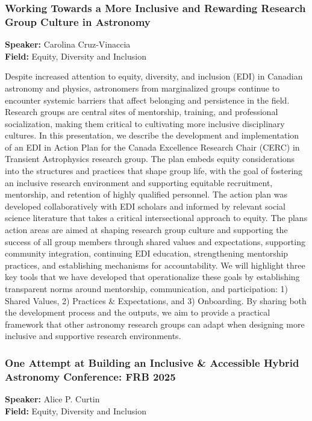 \hypertarget{abstract-talk-310}{}\label{abstract-page-talk-310}
\subsubsection*{Working Towards a More Inclusive and Rewarding Research Group Culture in Astronomy}
\textbf{Speaker:} Carolina Cruz-Vinaccia\\
\textbf{Field:} Equity, Diversity and Inclusion

Despite increased attention to equity, diversity, and inclusion (EDI) in Canadian astronomy and physics, astronomers from marginalized groups continue to encounter systemic barriers that affect belonging and persistence in the field. Research groups are central sites of mentorship, training, and professional socialization, making them critical to cultivating more inclusive disciplinary cultures. In this presentation, we describe the development and implementation of an EDI in Action Plan for the Canada Excellence Research Chair (CERC) in Transient Astrophysics research group. The plan embeds equity considerations into the structures and practices that shape group life, with the goal of fostering an inclusive research environment and supporting equitable recruitment, mentorship, and retention of highly qualified personnel. The action plan was developed collaboratively with EDI scholars and informed by relevant social science literature that takes a critical intersectional approach to equity. The plans action areas are aimed at shaping research group culture and supporting the success of all group members through shared values and expectations, supporting community integration, continuing EDI education, strengthening mentorship practices, and establishing mechanisms for accountability. We will highlight three key tools that we have developed that operationalize these goals by establishing transparent norms around mentorship, communication, and participation: 1) Shared Values, 2) Practices \& Expectations, and 3) Onboarding. By sharing both the development process and the outputs, we aim to provide a practical framework that other astronomy research groups can adapt when designing more inclusive and supportive research environments.

\hypertarget{abstract-talk-135}{}\label{abstract-page-talk-135}
\subsubsection*{One Attempt at Building an Inclusive \& Accessible Hybrid Astronomy Conference: FRB 2025}
\textbf{Speaker:} Alice P. Curtin\\
\textbf{Field:} Equity, Diversity and Inclusion

